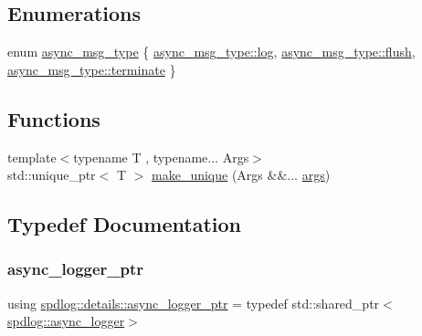 \subsection*{Enumerations}
\begin{DoxyCompactItemize}
\item 
enum \hyperlink{namespacespdlog_1_1details_a22274995cf879a5d0a08d1f7513ee4fb}{async\+\_\+msg\+\_\+type} \{ \hyperlink{namespacespdlog_1_1details_a22274995cf879a5d0a08d1f7513ee4fbadc1d71bbb5c4d2a5e936db79ef10c19f}{async\+\_\+msg\+\_\+type\+::log}, 
\hyperlink{namespacespdlog_1_1details_a22274995cf879a5d0a08d1f7513ee4fba86f354b8575a1a736775ae003fa344e5}{async\+\_\+msg\+\_\+type\+::flush}, 
\hyperlink{namespacespdlog_1_1details_a22274995cf879a5d0a08d1f7513ee4fba1459e53d3fbaa95cebaf90860dd7a259}{async\+\_\+msg\+\_\+type\+::terminate}
 \}
\end{DoxyCompactItemize}
\subsection*{Functions}
\begin{DoxyCompactItemize}
\item 
{\footnotesize template$<$typename T , typename... Args$>$ }\\std\+::unique\+\_\+ptr$<$ T $>$ \hyperlink{namespacespdlog_1_1details_a2d61216ea1cb33ba27ddc6a78cc98ecd}{make\+\_\+unique} (Args \&\&... \hyperlink{printf_8h_a47047b7b28fd1342eef756b79c778580}{args})
\end{DoxyCompactItemize}


\subsection{Typedef Documentation}
\mbox{\label{namespacespdlog_1_1details_a9b6989c16b6150f7e4658ea2aee01bc2}} 
\subsubsection{\texorpdfstring{async\+\_\+logger\+\_\+ptr}{async\_logger\_ptr}}
{\footnotesize\ttfamily using \hyperlink{namespacespdlog_1_1details_a9b6989c16b6150f7e4658ea2aee01bc2}{spdlog\+::details\+::async\+\_\+logger\+\_\+ptr} = typedef std\+::shared\+\_\+ptr$<$\hyperlink{classspdlog_1_1async__logger}{spdlog\+::async\+\_\+logger}$>$}




